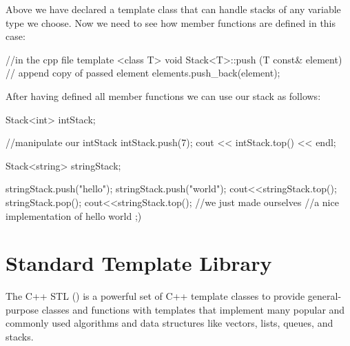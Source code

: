\documentclass[10pt,a4paper]{scrartcl}
\begin{document}
\begin{multicols*}{2}
Above we have declared a template class that can handle stacks of any variable type we choose. Now we need to see how member functions are defined in this case:

\begin{TPCpp}
//in the cpp file
template <class T>
void Stack<T>::push (T const& element){
	// append copy of passed element
	elements.push_back(element);
}
\end{TPCpp}

After having defined all member functions we can use our stack as follows:

\begin{TPCpp}
Stack<int> intStack;

//manipulate our intStack
intStack.push(7);
cout << intStack.top() << endl;

Stack<string> stringStack;

stringStack.push("hello");
stringStack.push("world");
cout<<stringStack.top();
stringStack.pop();
cout<<stringStack.top();
//we just made ourselves 
//a nice implementation of hello world ;)
\end{TPCpp}
\fi

\section{Standard Template Library}
\label{sec:StandardTemplateLibrary}

The C++ STL () is a powerful set of C++ template classes to provide general-purpose classes and functions with templates that implement many popular and commonly used algorithms and data structures like vectors, lists, queues, and stacks.

\end{multicols*}
\end{document}
